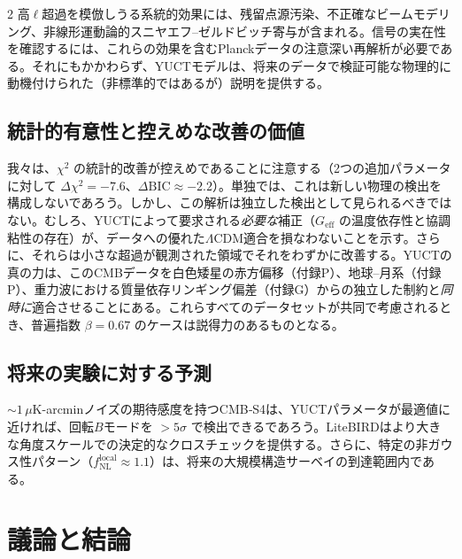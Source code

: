 \documentclass[11pt,a4paper]{article}
\begin{document}
\begin{multicols}{2}
		高\(\ell\)超過を模倣しうる系統的効果には、残留点源汚染、不正確なビームモデリング、非線形運動論的スニヤエフ–ゼルドビッチ寄与が含まれる。信号の実在性を確認するには、これらの効果を含むPlanckデータの注意深い再解析が必要である。それにもかかわらず、YUCTモデルは、将来のデータで検証可能な物理的に動機付けられた（非標準的ではあるが）説明を提供する。
		
		\subsection{統計的有意性と控えめな改善の価値}
		
		我々は、\(\chi^2\) の統計的改善が控えめであることに注意する（2つの追加パラメータに対して \(\Delta\chi^2 = -7.6\)、\(\Delta\mathrm{BIC} \approx -2.2\)）。単独では、これは新しい物理の検出を構成しないであろう。しかし、この解析は独立した検出として見られるべきではない。むしろ、YUCTによって要求される\textit{必要な}補正（\(G_{\mathrm{eff}}\) の温度依存性と協調粘性の存在）が、データへの優れた\(\Lambda\)CDM適合を損なわないことを示す。さらに、それらは小さな超過が観測された領域でそれをわずかに改善する。YUCTの真の力は、このCMBデータを白色矮星の赤方偏移（付録P）、地球–月系（付録P）、重力波における質量依存リンギング偏差（付録G）からの独立した制約と\textit{同時に}適合させることにある。これらすべてのデータセットが共同で考慮されるとき、普遍指数 \(\beta=0.67\) のケースは説得力のあるものとなる。
		
		\subsection{将来の実験に対する予測}
		
		\(\sim 1\,\mu\)K-arcminノイズの期待感度を持つCMB‑S4は、YUCTパラメータが最適値に近ければ、回転\(B\)モードを \(>5\sigma\) で検出できるであろう。LiteBIRDはより大きな角度スケールでの決定的なクロスチェックを提供する。さらに、特定の非ガウス性パターン（\(f_{\mathrm{NL}}^{\mathrm{local}} \approx 1.1\)）は、将来の大規模構造サーベイの到達範囲内である。
		
		\section{議論と結論}
		

\end{multicols}
\end{document}
